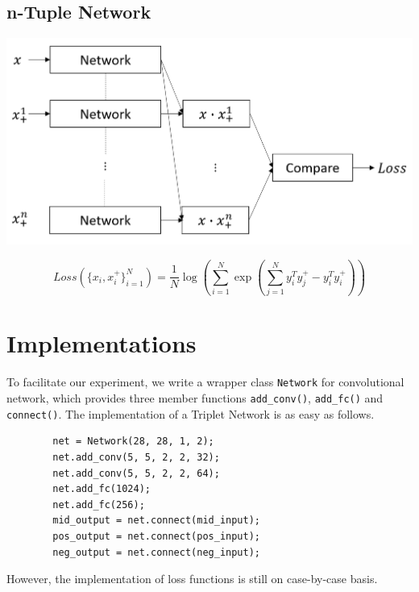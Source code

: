 \documentclass[a0,portrait]{a0poster}
\begin{document}
\begin{multicols}{2}
		\subsection*{n-Tuple Network}
		
		\begin{center}\vspace{1cm}
			\includegraphics[width=0.7\linewidth]{../report_shaoheng/tuple_struct}
		\end{center}\vspace{1cm}
		\begin{equation}
		Loss(\{x_i,x_i^+\}^N_{i=1})=\frac{1}{N}\log(\sum_{i=1}^N\exp(\sum_{j=1}^Ny^T_iy_j^+-y_i^Ty_i^+))  \label{eq:n-pair}
		\end{equation}
		
		\nocite{*} %
		
		\vspace{-1em}
		\section*{Implementations}
		To facilitate our experiment, we write a wrapper class \verb|Network| for convolutional network, which provides three member functions \verb|add_conv()|, \verb|add_fc()| and \verb|connect()|. The implementation of a Triplet Network is as easy as follows.
		\begin{verbatim}
		net = Network(28, 28, 1, 2);
		net.add_conv(5, 5, 2, 2, 32);    
		net.add_conv(5, 5, 2, 2, 64);
		net.add_fc(1024);                
		net.add_fc(256);
		mid_output = net.connect(mid_input);
		pos_output = net.connect(pos_input);
		neg_output = net.connect(neg_input);
		\end{verbatim}
		However, the implementation of loss functions is still on case-by-case basis.

\end{multicols}
\end{document}
